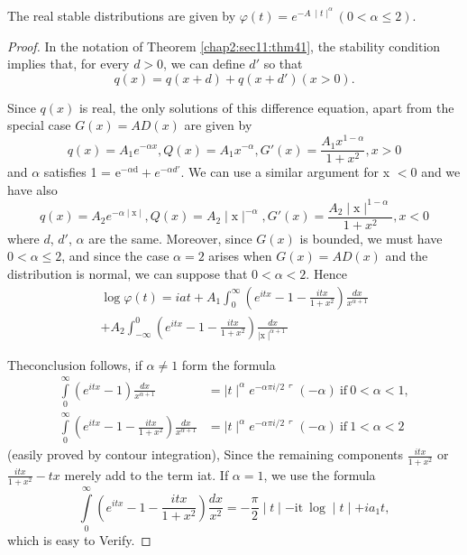 \begin{coro*}
  The real stable distributions are given by $\varphi (t) = e^{-A ~\mid
    t \mid^{\alpha}}(0<\alpha\leq 2)$.  
\end{coro*}

\begin{proof}
In the notation of Theorem \ref{chap2:sec11:thm41}, the stability condition implies that,
for every $d>0$, we can define $d'$ so that  
$$
q(x) = q(x+d) + q(x+d') (x>0).
$$

Since $q(x)$ is real, the only solutions of this difference equation,
apart from the special case $G(x) = AD(x)$ are given by  
$$
q(x) = A_1 e^{-\alpha x}, Q(x) = A_1 x^{-\alpha}, G'(x) = \frac{A_1
  x^{1-\alpha}}{1+x^{2}}, x>0
$$ 
and $\alpha$ satisfies 1 = e$^{-\alpha \text{d}} +
e^{-\alpha d'}$.  We can use a similar argument for x $<$0
and we have also 
$$
q(x) =A_2 e^{-\alpha\mid\text{x}\mid},Q(x) = A_2
\mid\text{x}\mid^{-\alpha}, G'(x) = \frac{A_2
  \mid\text{x}\mid^{1-\alpha}}{1+x^2},x<0
$$ 
where $d$, $d'$, $\alpha$ are the same. Moreover, since $G(x)$ is
bounded, we must have $0<\alpha\leq 2$, and since the case $\alpha =2$
arises when $G(x)= AD(x)$ and the distribution is normal, we can suppose
that $0<\alpha<2$.  Hence 
\begin{multline*}
  \log \varphi(t) = iat  + A_1  \int^{\infty}_0
  \left(e^{itx}-1-\frac{itx}{1+x^2}\right)\frac{dx}{x^{\alpha +1}}\\
  + A{_2} \int^{0}_{-\infty} \left(e^{itx}-1- \frac{itx}{1+x^2}\right)
  \frac{dx}{\mid \text{x}\mid^{\alpha+1}} 
\end{multline*}

The\pageoriginale conclusion follows, if $\alpha \neq  1 $ form the formula
\begin{align*} 
  \int\limits^{\infty}_{0}(e^{itx}-1) \frac{dx}{x^{\alpha +1}}  &= \mid
  t \mid^{\alpha} e^{-\alpha \pi i/2} \ulcorner (-\alpha)   ~\text{if}~ 0 <
  \alpha < 1,\\
  \int\limits^{\infty}_{0} \left(e^{itx} - 1 - \frac{itx}{1 + x^{2}}\right)
  \frac{dx}{x^{\alpha + 1}} &= \mid t \mid^{\alpha}  e ^{- \alpha \pi
    i/2} \ulcorner(-\alpha)   ~\text{if}~  1 < \alpha < 2
\end{align*} 
(easily proved by contour integration), Since the remaining components
$ \frac{itx}{1+x^{2}}$  or  $\frac{itx}{1 + x^{2}} - tx$  merely add
to the term iat.  If  $\alpha = 1$,  we use the formula 
$$
\int \limits^{\infty}_{0} \left(e^{itx} - 1- \frac{itx}{1 + x^{2}}\right)
\frac{dx}{x^{2}} = - \frac{\pi}{2}  \mid t \mid - \text{it}~  \log   \mid t
\mid +  i  a_{1}  t,  
$$
which is easy to Verify.
\end{proof}

